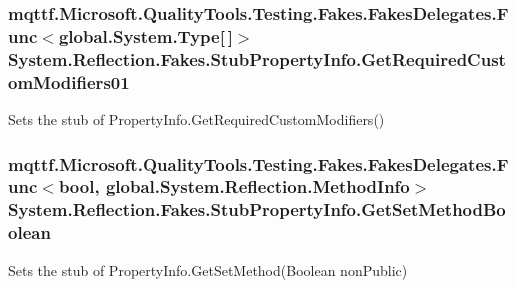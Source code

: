 \hypertarget{class_system_1_1_reflection_1_1_fakes_1_1_stub_property_info_aff3415a3fedffbdee750efa7994b7b90}{
\subsubsection[{Get\-Required\-Custom\-Modifiers01}]{\setlength{\rightskip}{0pt plus 5cm}mqttf.\-Microsoft.\-Quality\-Tools.\-Testing.\-Fakes.\-Fakes\-Delegates.\-Func$<$global.\-System.\-Type\mbox{[}$\,$\mbox{]}$>$ System.\-Reflection.\-Fakes.\-Stub\-Property\-Info.\-Get\-Required\-Custom\-Modifiers01}}\label{class_system_1_1_reflection_1_1_fakes_1_1_stub_property_info_aff3415a3fedffbdee750efa7994b7b90}


Sets the stub of Property\-Info.\-Get\-Required\-Custom\-Modifiers()

\hypertarget{class_system_1_1_reflection_1_1_fakes_1_1_stub_property_info_a10f7884f5c6150f954d91302de2f491a}{
\subsubsection[{Get\-Set\-Method\-Boolean}]{\setlength{\rightskip}{0pt plus 5cm}mqttf.\-Microsoft.\-Quality\-Tools.\-Testing.\-Fakes.\-Fakes\-Delegates.\-Func$<$bool, global.\-System.\-Reflection.\-Method\-Info$>$ System.\-Reflection.\-Fakes.\-Stub\-Property\-Info.\-Get\-Set\-Method\-Boolean}}\label{class_system_1_1_reflection_1_1_fakes_1_1_stub_property_info_a10f7884f5c6150f954d91302de2f491a}


Sets the stub of Property\-Info.\-Get\-Set\-Method(\-Boolean non\-Public)

